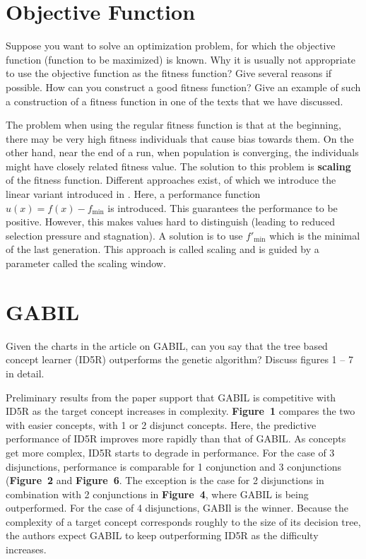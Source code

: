 \documentclass[../main.tex]{subfiles}
\begin{document}
\section{Objective Function}
\begin{question}
Suppose you want to solve an optimization problem, for which the objective function (function to be maximized) is
known. Why it is usually not appropriate to use the objective function as the fitness function? Give several reasons if
possible. How can you construct a good fitness function? Give an example of such a construction of a fitness function
in one of the texts that we have discussed.
\end{question}
\begin{solution}
The problem when using the regular fitness function is that at the beginning, there may be very high fitness
individuals that cause bias towards them. On the other hand, near the end of a run, when population is converging, the
individuals might have closely related fitness value. The solution to this problem is \textbf{scaling} of the fitness
function. Different approaches exist, of which we introduce the linear variant introduced in \cite{4075583}. Here, a
performance function  $u(x) = f(x) - f_\text{min}$ is introduced. This guarantees the performance to be positive.
However, this makes values hard to distinguish (leading to reduced selection pressure and stagnation). A solution is to
use $f'_\text{min}$ which is the minimal of the last generation. This approach is called scaling and is guided by a
parameter called the scaling window.
\end{solution}

\section{GABIL}
\begin{question}
Given the charts in the article on GABIL, can you say that the tree based concept learner (ID5R) outperforms the
genetic algorithm? Discuss figures 1 -- 7 in detail.
\end{question}
\begin{solution}
Preliminary results from the paper support that GABIL is competitive with ID5R as the target concept increases in
complexity.
\textbf{Figure~1} compares the two with easier concepts, with 1 or 2 disjunct concepts. Here, the predictive
performance of ID5R improves more rapidly than that of GABIL. As concepts get more complex, ID5R starts to degrade in
performance. For the case of 3 disjunctions, performance is comparable for  1 conjunction and 3 conjunctions
(\textbf{Figure~2} and \textbf{Figure~6}. The exception is the case for 2 disjunctions in combination with 2
conjunctions in \textbf{Figure~4}, where GABIL is being outperformed. For the case of 4 disjunctions, GABIl is the
winner. Because the complexity of a target concept corresponds roughly to the size of its decision tree, the authors
expect GABIL to keep outperforming ID5R as the difficulty increases.
\end{solution}
\end{document}
